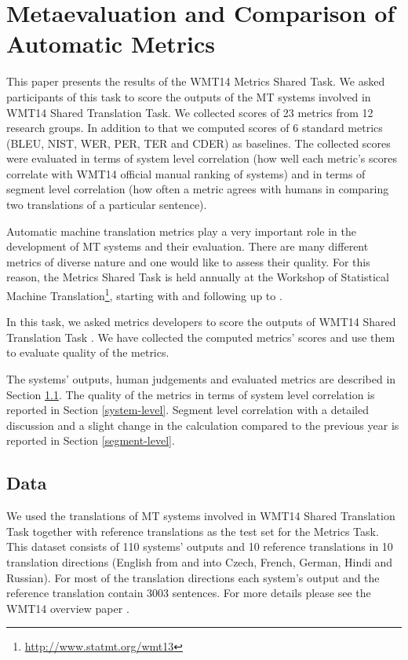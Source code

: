\chapter{Metaevaluation and Comparison of Automatic Metrics}
\label{metrics}

This paper presents the results of the WMT14 Metrics Shared Task. We asked
participants of this task to score the outputs of the MT systems involved in
WMT14 Shared Translation Task. We collected scores of 23 metrics from 12
research groups. In addition to that we computed scores of 6 standard metrics
(BLEU, NIST, WER, PER, TER and CDER) as baselines. The collected scores were
evaluated in terms of system level correlation (how well each metric's scores
correlate with WMT14 official manual ranking of systems) and in terms of
segment level correlation (how often a metric agrees with humans in comparing
two translations of a particular sentence).

Automatic machine translation metrics play a very important role in the
development of MT systems and their evaluation. There are many different
metrics of diverse nature and one would like to assess their quality. For this
reason, the Metrics Shared Task is held annually at the Workshop of Statistical
Machine Translation\footnote{\url{http://www.statmt.org/wmt13}}, starting with
 and following up to
.

In this task, we asked metrics developers to score the outputs of WMT14 Shared
Translation Task . We have collected the computed
metrics' scores and use them to evaluate quality of the metrics. 

The systems' outputs, human judgements and evaluated metrics are described in
Section \ref{section:data}. The quality of the metrics in terms of system level
correlation is reported in Section \ref{system-level}. Segment level
correlation with a detailed discussion and a slight change in the calculation
compared to the previous year is reported in Section \ref{segment-level}.

\section{Data}
\label{section:data}

We used the translations of MT systems involved in WMT14 Shared Translation
Task together with reference translations as the test set for the Metrics Task.
This dataset consists of 110 systems' outputs and 10 reference translations in
10 translation directions (English from and into Czech, French, German, Hindi
and Russian). For most of
the translation directions each system's output and the reference translation
contain 3003 sentences. For more details please see the WMT14 overview
paper . 

